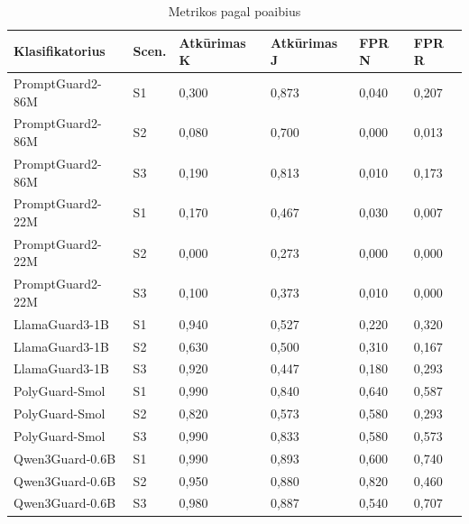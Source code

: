 \begin{table}[H]
  \caption{Metrikos pagal poaibius}\label{lent:poaibiai}
  \lentelesTekstas
  \small
  \begin{tabularx}{\textwidth}{|>{\raggedright\arraybackslash}X|C{1.2cm}|C{2.2cm}|C{2.2cm}|C{2.2cm}|C{2.2cm}|}
    \hline
    \textbf{Klasifikatorius} & \textbf{Scen.} & \textbf{Atkūrimas K} & \textbf{Atkūrimas J} & \textbf{FPR N} & \textbf{FPR R} \\
    \hline
    PromptGuard2-86M & S1 & 0,300 & 0,873 & 0,040 & 0,207 \\
    \hline
    PromptGuard2-86M & S2 & 0,080 & 0,700 & 0,000 & 0,013 \\
    \hline
    PromptGuard2-86M & S3 & 0,190 & 0,813 & 0,010 & 0,173 \\
    \hline
    PromptGuard2-22M & S1 & 0,170 & 0,467 & 0,030 & 0,007 \\
    \hline
    PromptGuard2-22M & S2 & 0,000 & 0,273 & 0,000 & 0,000 \\
    \hline
    PromptGuard2-22M & S3 & 0,100 & 0,373 & 0,010 & 0,000 \\
    \hline
    LlamaGuard3-1B & S1 & 0,940 & 0,527 & 0,220 & 0,320 \\
    \hline
    LlamaGuard3-1B & S2 & 0,630 & 0,500 & 0,310 & 0,167 \\
    \hline
    LlamaGuard3-1B & S3 & 0,920 & 0,447 & 0,180 & 0,293 \\
    \hline
    PolyGuard-Smol & S1 & 0,990 & 0,840 & 0,640 & 0,587 \\
    \hline
    PolyGuard-Smol & S2 & 0,820 & 0,573 & 0,580 & 0,293 \\
    \hline
    PolyGuard-Smol & S3 & 0,990 & 0,833 & 0,580 & 0,573 \\
    \hline
    Qwen3Guard-0.6B & S1 & 0,990 & 0,893 & 0,600 & 0,740 \\
    \hline
    Qwen3Guard-0.6B & S2 & 0,950 & 0,880 & 0,820 & 0,460 \\
    \hline
    Qwen3Guard-0.6B & S3 & 0,980 & 0,887 & 0,540 & 0,707 \\
    \hline
  \end{tabularx}
\end{table}

